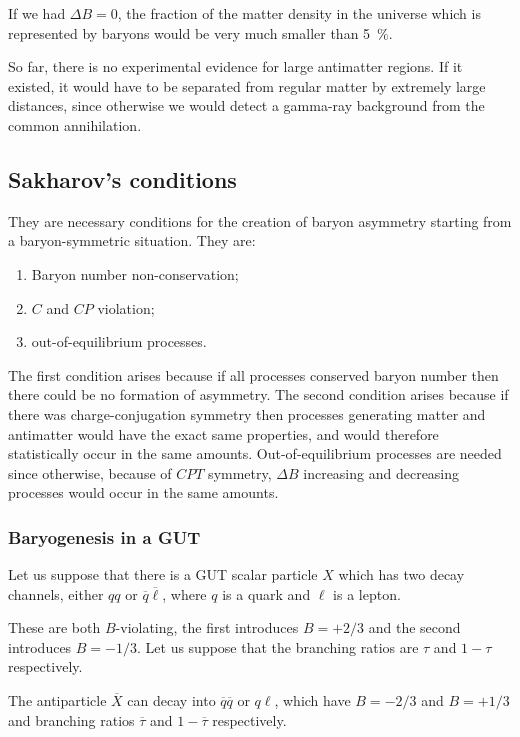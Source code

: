 \documentclass[main.tex]{subfiles}
\begin{document}
If we had \(\Delta B = 0\), the fraction of the matter density in the universe which is represented by baryons would be very much smaller than \SI{5}{\percent}. 

So far, there is no experimental evidence for large antimatter regions.
If it existed, it would have to be separated from regular matter by extremely large distances, since otherwise we would detect a gamma-ray background from the common annihilation. 

\subsection{Sakharov's conditions}

They are necessary conditions for the creation of baryon asymmetry starting from a baryon-symmetric situation. 
They are: 
\begin{enumerate}
    \item Baryon number non-conservation;
    \item \(C\) and \(CP\) violation;
    \item out-of-equilibrium processes.
\end{enumerate}

The first condition arises because if all processes conserved baryon number then there could be no formation of asymmetry. 
The second condition arises because if there was charge-conjugation symmetry then processes generating matter and antimatter would have the exact same properties, and would therefore statistically occur in the same amounts.
Out-of-equilibrium processes are needed since otherwise, because of \(CPT\) symmetry, \(\Delta B\) increasing and decreasing processes would occur in the same amounts. 

\subsubsection{Baryogenesis in a GUT}

Let us suppose that there is a GUT scalar particle \(X\) which has two decay channels, either \(qq\) or \(\overline{q} \overline{\ell}\), where \(q\) is a quark and \(\ell\) is a lepton. 

These are both \(B\)-violating, the first introduces \(B = +2/3\) and the second introduces \(B = - 1/3\).
Let us suppose that the branching ratios are \(\tau \) and \(1 - \tau \) respectively. 

The antiparticle \(\overline{X}\) can decay into \(\overline{q} \overline{q}\) or \(q \ell\), which have \(B = - 2/3\) and \(B = + 1/3\) and branching ratios \(\overline{\tau}\) and \(1 - \overline{\tau}\) respectively.
\end{document}
